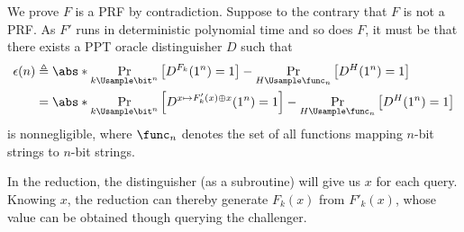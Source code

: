 \begin{answer}[b]
    We prove $F$ is a PRF by contradiction.
    Suppose to the contrary that $F$ is not a PRF. As $F'$ runs in deterministic polynomial time and so does $F$, it must be that there exists a PPT oracle distinguisher $D$ such that
    \begin{align}\label{eq:p2-2-1}
        \epsilon(n)&\triangleq \abs*{\Pr_{k\Usample\bit^n}\left[D^{F_k}(1^n)=1\right] - \Pr_{H\Usample\func_n}\left[D^{H}(1^n)=1\right]} \notag\\
        &=\abs*{\Pr_{k\Usample\bit^n}\left[D^{x\mapsto F'_k(x)\oplus x}(1^n)=1\right] - \Pr_{H\Usample\func_n}\left[D^{H}(1^n)=1\right]}
    \end{align}
    is nonnegligible, where $\func_n$ denotes the set of all functions mapping $n$-bit strings to $n$-bit strings.

    \begin{intuition}
        In the reduction, the distinguisher (as a subroutine) will give us $x$ for each query. Knowing $x$, the reduction can thereby generate $F_k(x)$ from $F'_k(x)$, whose value can be obtained though querying the challenger. 
    \end{intuition}


\end{answer}
